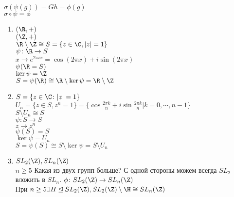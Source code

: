 \begin{Rem}
$\sigma(\psi(g)) = Gh = \phi(g)$ \\
$\sigma \circ \psi = \phi$\\
\end{Rem}
\begin{exmp}
\begin{enumerate}
\item
$(\R, +)$\\
$(\Z, +)$\\
$\R \setminus \Z \cong S = \{z \in \C, |z| = 1\}$ \\
$\psi\colon \R \to S$\\
$x \to e^{2\pi i x} = \cos(2\pi x) + i \sin(2\pi x)$\\
$\psi(\R = S)$\\
$\ker \psi = \Z$\\
$S = \psi(\R) \cong \R \setminus \ker \psi = \R \setminus \Z$\\
\item
$S = \{z \in \C \colon |z| = 1\}$\\
$U_n = \{z \in S, z^n = 1\} = \{\cos \frac{2\pi k}{n} + i \sin\frac{2\pi k}{n}| k = 0, \cdots, n - 1\}$\\
$S \setminus U_n \cong S$\\
$\psi\colon S \to S$\\
$z \to z^{n}$\\
$\psi(S) = S$\\
$\ker \psi = U_n$\\
$S = \psi(S) \cong S \setminus \ker \psi = S \setminus U_n$\\
\item
$SL_2(\Z), SL_n(\Z)$\\
$n \ge 5$
Какая из двух групп больше? 
С одной стороны можем всегда $SL_2$ вложить в $SL_n$.
$\phi \colon SL_2(\Z) \to SL_n(\Z)$\\
При $n \ge 5 \exists H \unlhd SL_2(\Z), SL_2(\Z) \setminus \H \cong SL_n(\Z)$
\end{enumerate}
\end{exmp}